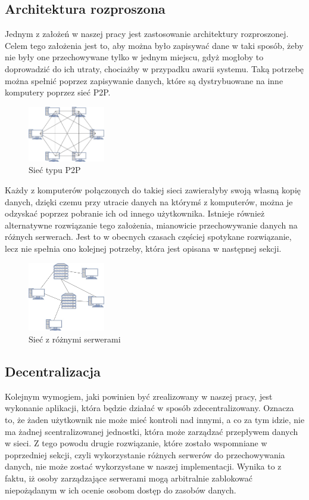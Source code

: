 \subsection{Architektura rozproszona}
\label{sec:Rozproszenie}
Jednym z założeń w naszej pracy jest zastosowanie architektury rozproszonej. Celem tego założenia jest to, aby można było zapisywać dane w taki sposób, żeby nie były one przechowywane tylko w jednym miejscu, gdyż mogłoby to doprowadzić do ich utraty, chociażby w przypadku awarii systemu. Taką potrzebę można spełnić poprzez zapisywanie danych, które są dystrybuowane na inne komputery poprzez sieć P2P. 
\begin{figure}[!ht]
	\centering
		\includegraphics[width=0.3\textwidth]{Images/P2P.jpg}
	\caption{Sieć typu P2P}
	\label{fig:P2P}
\end{figure}
\newline Każdy z komputerów połączonych do takiej sieci zawierałyby swoją własną kopię danych, dzięki czemu przy utracie danych na którymś z komputerów, można je odzyskać poprzez pobranie ich od innego użytkownika.
Istnieje również alternatywne rozwiązanie tego założenia, mianowicie przechowywanie danych na różnych serwerach. Jest to w obecnych czasach częściej spotykane rozwiązanie, lecz nie spełnia ono kolejnej potrzeby, która jest opisana w następnej sekcji.
\begin{figure}[!ht]
	\centering
		\includegraphics[width=0.3\textwidth]{Images/Siec_serwery.jpg}
	\caption{Sieć z różnymi serwerami}
	\label{fig:SiecSerwery}
\end{figure}
\newline

\subsection{Decentralizacja}
\label{sec:Decentralizacja}
Kolejnym wymogiem, jaki powinien być zrealizowany w naszej pracy, jest wykonanie aplikacji, która będzie działać w sposób zdecentralizowany. Oznacza to, że żaden użytkownik nie może mieć kontroli nad innymi, a co za tym idzie, nie ma żadnej scentralizowanej jednostki, która może zarządzać przepływem danych w sieci. Z tego powodu drugie rozwiązanie, które zostało wspomniane w poprzedniej sekcji, czyli wykorzystanie różnych serwerów do przechowywania danych, nie może zostać wykorzystane w naszej implementacji. Wynika to z faktu, iż osoby zarządzające serwerami mogą arbitralnie zablokować niepożądanym w ich ocenie osobom dostęp do zasobów danych.


